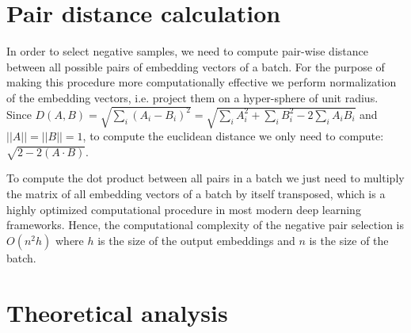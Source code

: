 \documentclass[sigconf]{acmart}
\begin{document}







\clearpage

\appendix

\section{Pair distance calculation} \label{app-sec-pair-dist}

In order to select negative samples, we need to compute pair-wise distance between all possible pairs of embedding vectors of a batch. For the purpose of making this procedure more computationally effective we perform normalization of the embedding vectors, i.e. project them on a hyper-sphere of unit radius. Since $D(A,B) = \sqrt{\sum_i(A_i - B_i)^2} = \sqrt{\sum_i A_i^2 + \sum_i B_i^2 - 2\sum_i A_i B_i} $ and $||A||= ||B||=1$, to compute the euclidean distance we only need to compute: $\sqrt{2 - 2(A \cdot B)}$.

To compute the dot product between all pairs in a batch we just need to multiply the matrix of all embedding vectors of a batch by itself transposed, which is a highly optimized computational procedure in most modern deep learning frameworks. Hence, the computational complexity of the negative pair selection is $O(n^2h)$ where $h$ is the size of the output embeddings and $n$ is the size of the batch.

\iffalse

\section{Theoretical analysis} \label{sec-theory}
\end{document}
